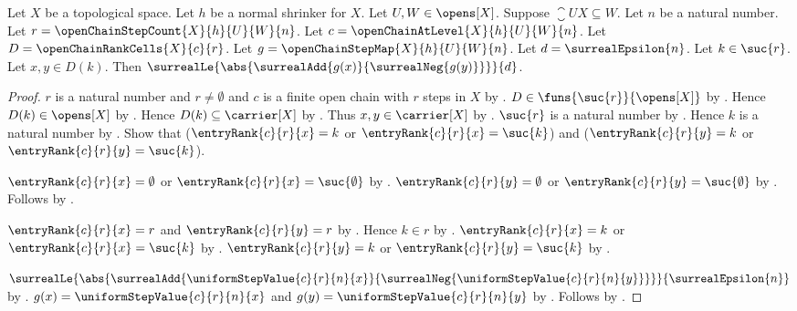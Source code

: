 \begin{theorem}\label{open_chain_step_map_cell_oscillation}
    Let $X$ be a topological space.
    Let $h$ be a normal shrinker for $X$.
    Let $U,W\in\opens[X]$.
    Suppose $\closure{U}{X}\subseteq W$.
    Let $n$ be a natural number.
    Let $r=\openChainStepCount{X}{h}{U}{W}{n}$.
    Let $c=\openChainAtLevel{X}{h}{U}{W}{n}$.
    Let $D=\openChainRankCells{X}{c}{r}$.
    Let $g=\openChainStepMap{X}{h}{U}{W}{n}$.
    Let $d=\surrealEpsilon{n}$.
    Let $k\in\suc{r}$.
    Let $x,y\in D(k)$.
    Then $\surrealLe{\abs{\surrealAdd{g(x)}{\surrealNeg{g(y)}}}}{d}$.
\end{theorem}
\begin{proof}
    $r$ is a natural number and $r\neq\emptyset$ and
        $c$ is a finite open chain with $r$ steps in $X$
        by .
    $D\in\funs{\suc{r}}{\opens[X]}$
        by .
    Hence $D(k)\in\opens[X]$ by .
    Hence $D(k)\subseteq\carrier[X]$
        by .
    Thus $x,y\in\carrier[X]$ by .
    $\suc{r}$ is a natural number by .
    Hence $k$ is a natural number
        by
        .
    Show that
        ($\entryRank{c}{r}{x}=k$ or
            $\entryRank{c}{r}{x}=\suc{k}$) and
        ($\entryRank{c}{r}{y}=k$ or
            $\entryRank{c}{r}{y}=\suc{k}$).
    \begin{subproof}
        \begin{byCase}
            $\entryRank{c}{r}{x}=\emptyset$ or
                $\entryRank{c}{r}{x}=\suc{\emptyset}$
                by .
            $\entryRank{c}{r}{y}=\emptyset$ or
                $\entryRank{c}{r}{y}=\suc{\emptyset}$
                by .
            Follows by \auto.
            \begin{byCase}
                $\entryRank{c}{r}{x}=r$ and
                    $\entryRank{c}{r}{y}=r$
                    by .
                Hence $k\in r$ by .
                $\entryRank{c}{r}{x}=k$ or
                    $\entryRank{c}{r}{x}=\suc{k}$
                    by .
                $\entryRank{c}{r}{y}=k$ or
                    $\entryRank{c}{r}{y}=\suc{k}$
                    by .
            \end{byCase}
        \end{byCase}
    \end{subproof}
    $\surrealLe{
        \abs{\surrealAdd{
            \uniformStepValue{c}{r}{n}{x}}
            {\surrealNeg{\uniformStepValue{c}{r}{n}{y}}}}}
        {\surrealEpsilon{n}}$
        by .
    $g(x)
        =\uniformStepValue{c}{r}{n}{x}$ and
        $g(y)
        =\uniformStepValue{c}{r}{n}{y}$
        by .
    Follows by \auto.
\end{proof}
